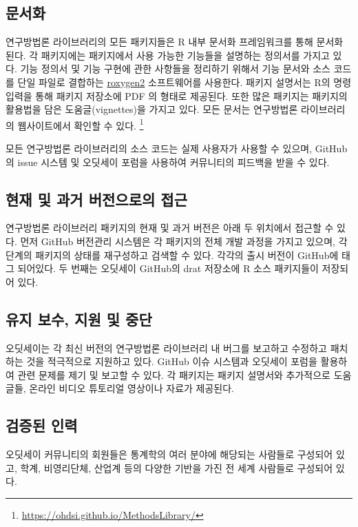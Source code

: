 \documentclass[11pt]{book}
\let\rmarkdownfootnote\footnote%
\def\footnote{\protect\rmarkdownfootnote}
\theoremstyle{definition}
\theoremstyle{definition}
\theoremstyle{definition}
\theoremstyle{remark}
\begin{document}
\subsection{문서화}

연구방법론 라이브러리의 모든 패키지들은 R 내부 문서화 프레임워크를 통해
문서화 된다. 각 패키지에는 패키지에서 사용 가능한 기능들을 설명하는
정의서를 가지고 있다. 기능 정의서 및 기능 구현에 관한 사항들을 정리하기
위해서 기능 문서와 소스 코드를 단일 파일로 결합하는
\href{https://cran.r-project.org/web/packages/roxygen2/vignettes/roxygen2.html}{roxygen2}
소프트웨어를 사용한다. 패키지 설명서는 R의 명령 입력을 통해 패키지
저장소에 PDF 의 형태로 제공된다. 또한 많은 패키지는 패키지의 활용법을
담은 도움글(vignettes)을 가지고 있다. 모든 문서는 연구방법론
라이브러리의 웹사이트에서 확인할 수 있다. \footnote{\url{https://ohdsi.github.io/MethodsLibrary/}}

모든 연구방법론 라이브러리의 소스 코드는 실제 사용자가 사용할 수 있으며,
GitHub의 issue 시스템 및 오딧세이 포럼을 사용하여 커뮤니티의 피드백을
받을 수 있다.

\subsection{현재 및 과거 버전으로의 접근}\label{----}

연구방법론 라이브러리 패키지의 현재 및 과거 버전은 아래 두 위치에서
접근할 수 있다. 먼저 GitHub 버전관리 시스템은 각 패키지의 전체 개발
과정을 가지고 있으며, 각 단계의 패키지의 상태를 재구성하고 검색할 수
있다. 각각의 출시 버전이 GitHub에 태그 되어있다. 두 번째는 오딧세이
GitHub의 drat 저장소에 R 소스 패키지들이 저장되어 있다.

\subsection{유지 보수, 지원 및 중단}\label{----}

오딧세이는 각 최신 버전의 연구방법론 라이브러리 내 버그를 보고하고
수정하고 패치하는 것을 적극적으로 지원하고 있다. GitHub 이슈 시스템과
오딧세이 포럼을 활용하여 관련 문제를 제기 및 보고할 수 있다. 각 패키지는
패키지 설명서와 추가적으로 도움글들, 온라인 비디오 튜토리얼 영상이나
자료가 제공된다.

\subsection{검증된 인력}\label{-}

오딧세이 커뮤니티의 회원들은 통계학의 여러 분야에 해당되는 사람들로
구성되어 있고, 학계, 비영리단체, 산업계 등의 다양한 기반을 가진 전 세계
사람들로 구성되어 있다.
\end{document}
